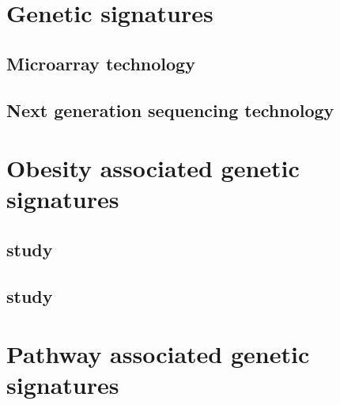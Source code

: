 \section{Genetic signatures}
\label{sec:genetic_signatures}

\subsection{Microarray technology}
\label{subsec:microarray_technology}

\subsection{Next generation sequencing technology}
\label{sub:next_generation sequencing_technology}





\section{Obesity associated genetic signatures}
\label{sec:obesity_associated_genetic_signatures}

\subsection{\citet{Creighton2012} study}
\label{sub:creighton_study}



\subsection{\citet{Fuentes-Mattei2014} study}
\label{sub:fuentes_mattei_study}




\section{Pathway associated genetic signatures}
\label{sec:pathway_associated_genetic_signatures}

